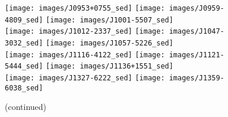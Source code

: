 \documentclass{pasa}%
\begin{document}
\begin{figure*}\ContinuedFloat
\texttt{[image: images/J0953+0755\_sed]}\hspace*{-0.5em}%
\hspace*{-0.5em}\texttt{[image: images/J0959-4809\_sed]} \hspace*{-0.5em}%
\hspace*{-0.5em}\texttt{[image: images/J1001-5507\_sed]} \\[-0.6em]
\texttt{[image: images/J1012-2337\_sed]}\hspace*{-0.5em}%
\hspace*{-0.5em}\texttt{[image: images/J1047-3032\_sed]}\hspace*{-0.5em}%
\hspace*{-0.5em}\texttt{[image: images/J1057-5226\_sed]} \\[-0.6em]
\texttt{[image: images/J1116-4122\_sed]}\hspace*{-0.5em}%
\hspace*{-0.5em}\texttt{[image: images/J1121-5444\_sed]}\hspace*{-0.5em}%
\hspace*{-0.5em}\texttt{[image: images/J1136+1551\_sed]} \\[-0.6em]
\texttt{[image: images/J1327-6222\_sed]}\hspace*{-0.5em} %
\hspace*{-0.5em}\texttt{[image: images/J1359-6038\_sed]}\hspace*{-0.5em}%
\\
\caption{(continued)}
\end{figure*}
\end{document}

